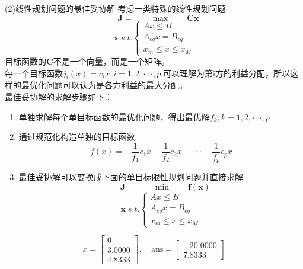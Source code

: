 \documentclass[10pt]{beamer}
\begin{document}
  \begin{frame}[allowframebreaks]{(2)线性规划问题的最佳妥协解}
    考虑一类特殊的线性规划问题\\
    $$\quad \bm{J} = \qquad \max \qquad \bm{Cx}$$
      $$
    \bm{x}\;s.t.
    \left\{
    \begin{array}{ccc}
      Ax\leq B\\
      A_{eq}x=B_{eq}\\
      x_m\leq x\leq x_M
    \end{array} 
    \right.
    $$
    目标函数的$\bm{C}$不是一个向量，而是一个矩阵。
    \\每一个目标函数$j_i(x) = c_ix,i=1,2,\cdot \cdot \cdot , p$,可以理解为第i方的利益分配，所以这样的最优化问题可以认为是各方利益的最大分配。
    \\最佳妥协解的求解步骤如下：
    \begin{enumerate}
      \item 单独求解每个单目标函数的最优化问题，得出最优解$f_k, k=1,2,\cdot \cdot \cdot , p$


      \item 通过规范化构造单独的目标函数
      $$f(x) = -\frac{1}{f_1}c_1x-\frac{1}{f_2}c_2x-\cdot \cdot \cdot -\frac{1}{f_p}c_px$$


      \item 最佳妥协解可以变换成下面的单目标限性规划问题并直接求解
      $$\quad \bm{J} = \qquad \min \qquad \bm{f(x)}$$
      $$
      \bm{x}\;s.t.
      \left\{
      \begin{array}{ccc}
        Ax\leq B\\
        A_{eq}x=B_{eq}\\
        x_m\leq x\leq x_M
      \end{array} 
      \right.
      $$


    \end{enumerate}
    \begin{equation}
      x =
      \begin{bmatrix}
       0\\
  3.0000\\
  4.8333
      \end{bmatrix},\quad
      \mathrm{ans} =
      \begin{bmatrix}
        -20.0000\\
          7.8333
        \end{bmatrix}
    \end{equation}
  \end{frame}
  
\end{document}
